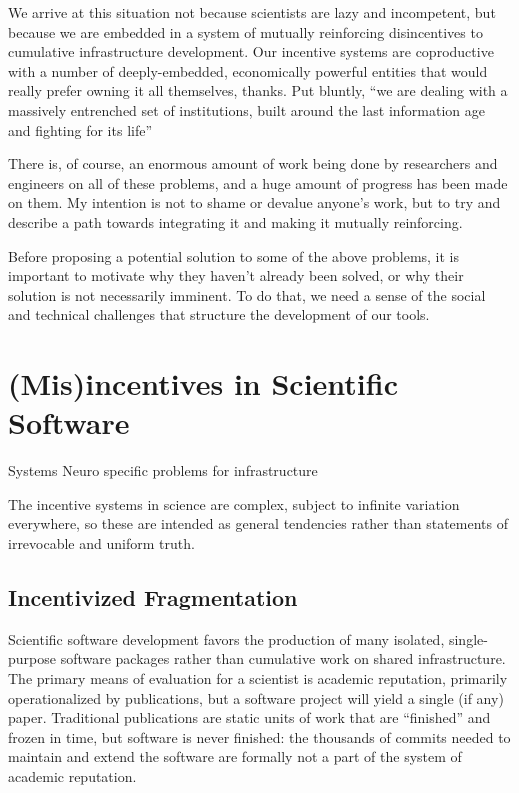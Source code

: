 \documentclass[notoc]{tufte-book}
\begin{document}
We arrive at this situation not because scientists are lazy and
incompetent, but because we are embedded in a system of mutually
reinforcing disincentives to cumulative infrastructure development. Our
incentive systems are coproductive with a number of deeply-embedded,
economically powerful entities that would really prefer owning it all
themselves, thanks. Put bluntly, ``we are dealing with a massively
entrenched set of institutions, built around the last information age
and fighting for its life'' \citep{bowkerInformationInfrastructureStudies2010} 

There is, of course, an enormous amount of work being done by
researchers and engineers on all of these problems, and a huge amount of
progress has been made on them. My intention is not to shame or devalue
anyone's work, but to try and describe a path towards integrating it and
making it mutually reinforcing.

Before proposing a potential solution to some of the above problems, it
is important to motivate why they haven't already been solved, or why
their solution is not necessarily imminent. To do that, we need a sense
of the social and technical challenges that structure the development of
our tools. 




\section{(Mis)incentives in Scientific
Software}

Systems Neuro {specific problems for infrastructure}



 The incentive systems in science are complex, subject to
infinite variation everywhere, so these are intended as general
tendencies rather than statements of irrevocable and uniform truth.


\subsection{Incentivized
Fragmentation}

Scientific software development favors the production of many isolated,
single-purpose software packages rather than cumulative work on shared
infrastructure. The primary means of evaluation for a scientist is
academic reputation, primarily operationalized by publications, but a
software project will yield a single (if any) paper. Traditional
publications are static units of work that are ``finished'' and frozen
in time, but software is never finished: the thousands of commits needed
to maintain and extend the software are formally not a part of the
system of academic reputation.
\end{document}
